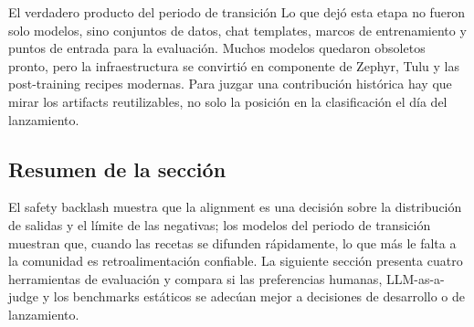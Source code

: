 
\begin{knowledgebox}{El verdadero producto del periodo de transición}
Lo que dejó esta etapa no fueron solo modelos, sino conjuntos de datos, chat templates, marcos de entrenamiento y puntos de entrada para la evaluación. Muchos modelos quedaron obsoletos pronto, pero la infraestructura se convirtió en componente de Zephyr, Tulu y las post-training recipes modernas. Para juzgar una contribución histórica hay que mirar los artifacts reutilizables, no solo la posición en la clasificación el día del lanzamiento.
\end{knowledgebox}

\subsection{Resumen de la sección}

El safety backlash muestra que la alignment es una decisión sobre la distribución de salidas y el límite de las negativas; los modelos del periodo de transición muestran que, cuando las recetas se difunden rápidamente, lo que más le falta a la comunidad es retroalimentación confiable. La siguiente sección presenta cuatro herramientas de evaluación y compara si las preferencias humanas, LLM-as-a-judge y los benchmarks estáticos se adecúan mejor a decisiones de desarrollo o de lanzamiento.
